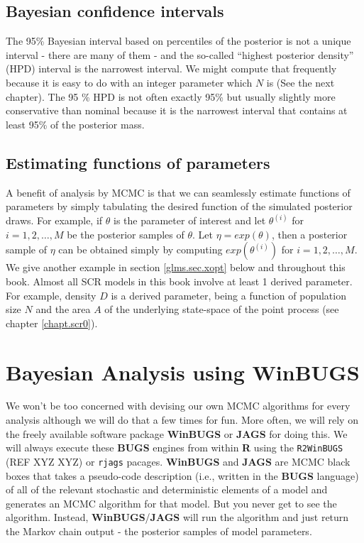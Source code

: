 \subsection{Bayesian confidence intervals} 

The 95\% Bayesian interval based on percentiles of the posterior
is not a unique interval - there are many of them - and the so-called
``highest posterior density'' (HPD) interval is the narrowest
interval. We might compute that frequently because it is easy to do
with an integer parameter which $N$ is (See the next chapter). The
95 \% HPD is not often exactly 95\% but usually slightly more
conservative than nominal because it is the narrowest interval that
contains at least 95\%  of the posterior mass.

\subsection{Estimating functions of parameters}

A benefit of analysis by MCMC is that we can seamlessly estimate
functions of parameters by simply tabulating the desired function of
the simulated posterior draws. For example, if $\theta$ is the
parameter of interest and let $\theta^{(i)}$ for $i=1,2,\ldots,M$ be
the posterior samples of $\theta$. Let $\eta = exp(\theta)$, then a
posterior sample of $\eta$ can be obtained simply by computing
$exp(\theta^{(i)})$ for $i=1,2,\ldots,M$. We give another example in
section 
\ref{glms.sec.xopt}
below and throughout this book.
Almost all SCR models in this book involve at least 1 derived
parameter. For example, density $D$ is a derived parameter, being a
function of population size $N$ and the area $A$ of the underlying
state-space of the point process (see chapter \ref{chapt.scr0}). 

\section{Bayesian Analysis using WinBUGS}

We won't be too concerned with devising our own MCMC algorithms for
every analysis
although we will do that a few times for fun.  More often, we
will rely on the freely available software package {\bf WinBUGS} or
{\bf JAGS}
for doing this.  We will always execute these {\bf BUGS} engines from
within {\bf R} using the \mbox{\tt R2WinBUGS} (REF XYZ XYZ) or
\mbox{\tt rjags} pacages. {\bf WinBUGS} and {\bf JAGS} are  MCMC black boxes
that takes a pseudo-code description (i.e., written in the {\bf BUGS}
language) of all of the relevant stochastic
and deterministic elements of a model and generates an MCMC algorithm
for that model. But you never get to see the algorithm. Instead,
{\bf WinBUGS}/{\bf JAGS} will run the algorithm and just return the Markov chain output
- the posterior samples of model parameters. 

